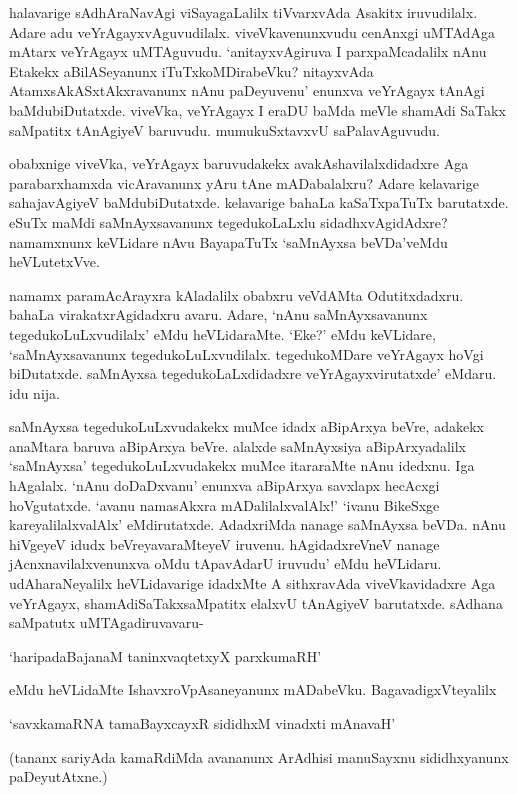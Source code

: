 halavarige sAdhAraNavAgi viSayagaLalilx tiVvarxvAda Asakitx iruvudilalx. Adare adu veYrAgayxvAguvudilalx. viveVkavenunxvudu cenAnxgi uMTAdAga mAtarx veYrAgayx uMTAguvudu. `anitayxvAgiruva I parxpaMcadalilx nAnu Etakekx aBilASeyanunx iTuTxkoMDirabeVku? nitayxvAda AtamxsAkASxtAkxravanunx nAnu paDeyuvenu' enunxva veYrAgayx tAnAgi baMdubiDutatxde. viveVka, veYrAgayx I eraDU baMda meVle shamAdi SaTakx saMpatitx tAnAgiyeV baruvudu. mumukuSxtavxvU saPalavAguvudu.

obabxnige viveVka, veYrAgayx baruvudakekx avakAshavilalxdidadxre Aga parabarxhamxda vicAravanunx yAru tAne mADabalalxru? Adare kelavarige sahajavAgiyeV baMdubiDutatxde. kelavarige bahaLa kaSaTxpaTuTx barutatxde. eSuTx maMdi saMnAyxsavanunx tegedukoLaLxlu sidadhxvAgidAdxre? namamxnunx keVLidare nAvu BayapaTuTx `saMnAyxsa beVDa'veMdu heVLutetxVve.

namamx paramAcArayxra kAladalilx obabxru veVdAMta Odutitxdadxru. bahaLa virakatxrAgidadxru avaru. Adare, `nAnu saMnAyxsavanunx tegedukoLuLxvudilalx' eMdu heVLidaraMte. `Eke?' eMdu keVLidare, `saMnAyxsavanunx tegedukoLuLxvudilalx. tegedukoMDare veYrAgayx hoVgi biDutatxde. saMnAyxsa tegedukoLaLxdidadxre veYrAgayxvirutatxde' eMdaru. idu nija.

saMnAyxsa tegedukoLuLxvudakekx muMce idadx aBipArxya beVre, adakekx anaMtara baruva aBipArxya beVre. alalxde saMnAyxsiya aBipArxyadalilx `saMnAyxsa' tegedukoLuLxvudakekx muMce itararaMte nAnu idedxnu. Iga hAgalalx. `nAnu doDaDxvanu' enunxva aBipArxya savxlapx hecAcxgi hoVgutatxde. `avanu namasAkxra mADalilalxvalAlx!' `ivanu BikeSxge kareyalilalxvalAlx' eMdirutatxde. AdadxriMda nanage saMnAyxsa beVDa. nAnu hiVgeyeV idudx beVreyavaraMteyeV iruvenu. hAgidadxreVneV nanage jAcnxnavilalxvenunxva oMdu tApavAdarU iruvudu' eMdu heVLidaru. udAharaNeyalilx heVLidavarige idadxMte A sithxravAda viveVkavidadxre Aga veYrAgayx, shamAdiSaTakxsaMpatitx elalxvU tAnAgiyeV barutatxde. sAdhana saMpatutx uMTAgadiruvavaru-

\begin{shloka}
`haripadaBajanaM taninxvaqtetxyX parxkumaRH'
\end{shloka}

eMdu heVLidaMte IshavxroVpAsaneyanunx mADabeVku. BagavadigxVteyalilx 

\begin{shloka}
`savxkamaRNA tamaBayxcayxR sididhxM vinadxti mAnavaH'
\end{shloka}

(tananx sariyAda kamaRdiMda avananunx ArAdhisi manuSayxnu sididhxyanunx paDeyutAtxne.)

